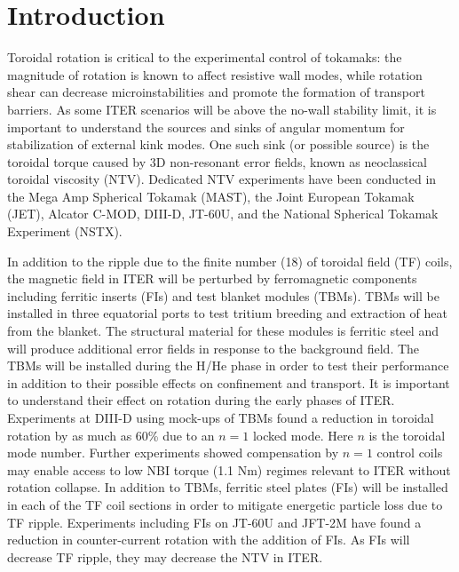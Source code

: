 \documentclass[aip, pop, preprint]{revtex4-1}
\numberwithin{figure}{section}
\numberwithin{equation}{section}
\begin{document}
\maketitle

\section{Introduction}

Toroidal rotation is critical to the experimental control of tokamaks: the magnitude of rotation is known to affect resistive wall modes,\cite{Bondeson1994, Garofalo2002} while rotation shear can decrease microinstabilities and promote the formation of transport barriers.\cite{Burrell1997, Terry2000} As some ITER scenarios will be above the no-wall stability limit,\cite{Liu2004} it is important to understand the sources and sinks of angular momentum for stabilization of external kink modes. One such sink (or possible source) is the toroidal torque caused by 3D non-resonant error fields, known as neoclassical toroidal viscosity (NTV). Dedicated NTV experiments have been conducted in the Mega Amp Spherical Tokamak (MAST),\cite{Hua2010} the Joint European Tokamak (JET),\cite{Lazzaro2002, DeVries2008b} Alcator C-MOD,\cite{Wolfe2005}  DIII-D,\cite{Garofalo2008,Reimerdes2009} JT-60U,\cite{Honda2014} and the National Spherical Tokamak Experiment (NSTX).\cite{Zhu2006} 

In addition to the ripple due to the finite number (18) of toroidal field (TF) coils, the magnetic field in ITER will be perturbed by ferromagnetic components including ferritic inserts (FIs) and test blanket modules (TBMs). TBMs will be installed in three equatorial ports to test tritium breeding and extraction of heat from the blanket. The structural material for these modules is ferritic steel and will produce additional error fields in response to the background field. The TBMs will be installed during the H/He phase in order to test their performance in addition to their possible effects on confinement and transport.\cite{Chuyanov2010} It is important to understand their effect on rotation during the early phases of ITER. Experiments at DIII-D using mock-ups of TBMs found a reduction in toroidal rotation by as much as 60\% due to an $n = 1$ locked mode.\cite{Schaffer2011} Here $n$ is the toroidal mode number. Further experiments showed compensation by $n=1$ control coils may enable access to low NBI torque (1.1 Nm) regimes relevant to ITER without rotation collapse.\cite{Lanctot2017} In addition to TBMs, ferritic steel plates (FIs) will be installed in each of the TF coil sections in order to mitigate energetic particle loss due to TF ripple.\cite{Tobita2003} Experiments including FIs on JT-60U\cite{Urano2007} and JFT-2M\cite{Kawashima2001} have found a reduction in counter-current rotation with the addition of FIs. As FIs will decrease TF ripple, they may decrease the NTV in ITER.
\end{document}
